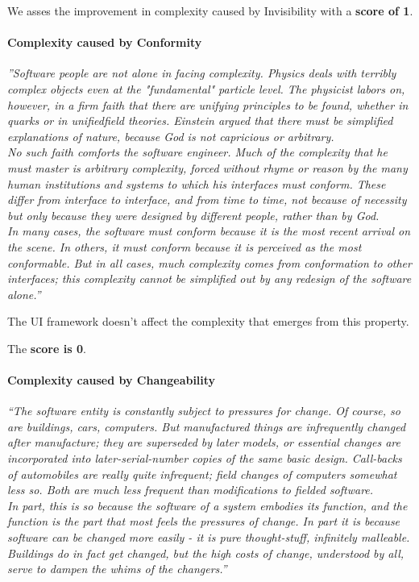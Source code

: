 We asses the improvement in complexity caused by Invisibility with a \textbf{score of 1}.

\paragraph{Complexity caused by Conformity}
\textit{''Software people are not alone in facing complexity. Physics deals with terribly complex objects even at the "fundamental" particle level. The physicist labors on, however, in a firm faith that there are unifying principles to be found, whether in quarks or in unifiedfield theories. Einstein argued that there must be simplified explanations of nature, because God is not capricious or arbitrary. \\ No such faith comforts the software engineer. Much of the complexity that he must master is arbitrary complexity, forced without rhyme or reason by the many human institutions and systems to which his interfaces must conform. These differ from interface to interface, and from time to time, not because of necessity but only because they were designed by different people, rather than by God. \\ In many cases, the software must conform because it is the most recent arrival on the scene. In others, it must conform because it is perceived as the most conformable. But in all cases, much complexity comes from conformation to other interfaces; this complexity cannot be simplified out by any redesign of the software alone.''} \citep[p.~3]{nosilverbullet}

The UI framework doesn't affect the complexity that emerges from this property.

The \textbf{score is 0}.

\paragraph{Complexity caused by Changeability}
\textit{``The software entity is constantly subject to pressures for change. Of course, so are buildings, cars, computers. But manufactured things are infrequently changed after manufacture; they are superseded by later models, or essential changes are incorporated into later-serial-number copies of the same basic design. Call-backs of automobiles are really quite infrequent; field changes of computers somewhat less so. Both are much less frequent than modifications to fielded software. \\ In part, this is so because the software of a system embodies its function, and the function is the part that most feels the pressures of change. In part it is because software can be changed more easily - it is pure thought-stuff, infinitely malleable. Buildings do in fact get changed, but the high costs of change, understood by all, serve to dampen the whims of the changers.''} \citep[p.~4]{nosilverbullet}


